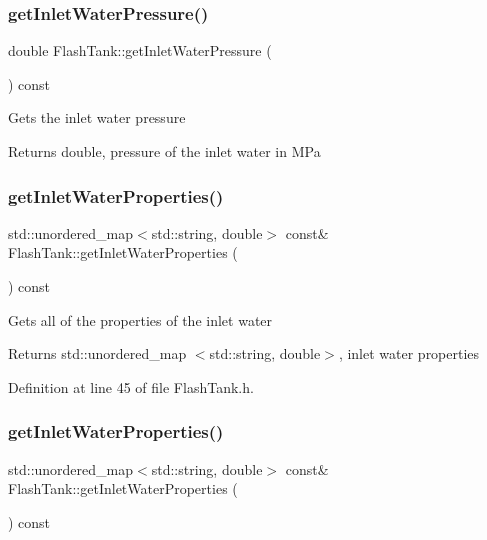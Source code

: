 \subsubsection{\texorpdfstring{get\+Inlet\+Water\+Pressure()}{getInletWaterPressure()}\hspace{0.1cm}{\footnotesize\ttfamily [3/3]}}
{\footnotesize\ttfamily double Flash\+Tank\+::get\+Inlet\+Water\+Pressure (\begin{DoxyParamCaption}{ }\end{DoxyParamCaption}) const}

Gets the inlet water pressure \begin{DoxyReturn}{Returns}
double, pressure of the inlet water in M\+Pa 
\end{DoxyReturn}
\mbox{\label{class_flash_tank_a57a316e4ef448f4a9447b675ba6ac84b}} 
\subsubsection{\texorpdfstring{get\+Inlet\+Water\+Properties()}{getInletWaterProperties()}\hspace{0.1cm}{\footnotesize\ttfamily [1/3]}}
{\footnotesize\ttfamily std\+::unordered\+\_\+map$<$std\+::string, double$>$ const\& Flash\+Tank\+::get\+Inlet\+Water\+Properties (\begin{DoxyParamCaption}{ }\end{DoxyParamCaption}) const\hspace{0.3cm}{\ttfamily [inline]}}

Gets all of the properties of the inlet water \begin{DoxyReturn}{Returns}
std\+::unordered\+\_\+map $<$std\+::string, double$>$, inlet water properties 
\end{DoxyReturn}


Definition at line 45 of file Flash\+Tank.\+h.

\mbox{\label{class_flash_tank_a57a316e4ef448f4a9447b675ba6ac84b}} 
\subsubsection{\texorpdfstring{get\+Inlet\+Water\+Properties()}{getInletWaterProperties()}\hspace{0.1cm}{\footnotesize\ttfamily [2/3]}}
{\footnotesize\ttfamily std\+::unordered\+\_\+map$<$std\+::string, double$>$ const\& Flash\+Tank\+::get\+Inlet\+Water\+Properties (\begin{DoxyParamCaption}{ }\end{DoxyParamCaption}) const\hspace{0.3cm}{\ttfamily [inline]}}

